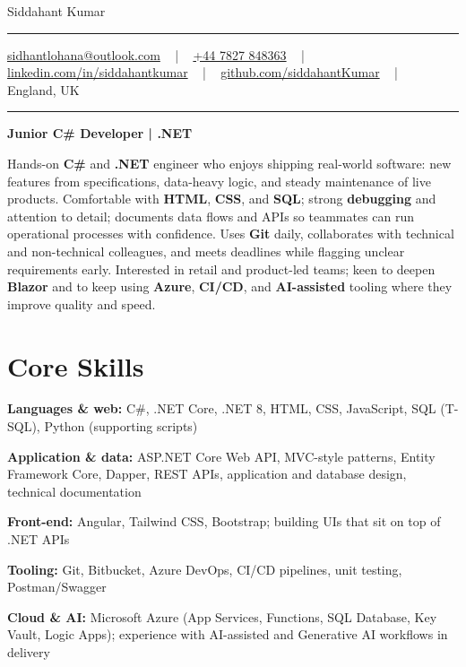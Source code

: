 \documentclass[letterpaper,10pt]{article}
\newcommand{\documentTitle}[2]{
  \begin{center}
    \vspace*{-0.3in}
    {\Huge\color{accentTitle} #1}
    \vspace{8pt}
    {\color{accentLine} \hrule}
    \vspace{2pt}
    \footnotesize{#2}
    \vspace{2pt}
    {\color{accentLine} \hrule}
  \end{center}
}
\newenvironment{resume_list}{
  \vspace{-7pt}
  \begin{itemize}[itemsep=-2px, parsep=1pt, leftmargin=30pt]
}{
  \end{itemize}
}
\begin{document}
\documentTitle{Siddahant Kumar}{
\vspace{0.1cm}
\href{mailto:sidhantlohana@outlook.com}{sidhantlohana@outlook.com} ~ | ~
\href{tel:+447827848363}{+44 7827 848363} ~ | ~
\href{https://www.linkedin.com/in/siddahantkumar/}{linkedin.com/in/siddahantkumar} ~ | ~
\href{https://github.com/siddahantKumar}{github.com/siddahantKumar} ~ | ~
England, UK
}

\begin{center}
\textbf{Junior C\# Developer | .NET}
\end{center}

Hands-on \textbf{C\#} and \textbf{.NET} engineer who enjoys shipping real-world software: new features from specifications, data-heavy logic, and steady maintenance of live products. Comfortable with \textbf{HTML}, \textbf{CSS}, and \textbf{SQL}; strong \textbf{debugging} and attention to detail; documents data flows and APIs so teammates can run operational processes with confidence. Uses \textbf{Git} daily, collaborates with technical and non-technical colleagues, and meets deadlines while flagging unclear requirements early. Interested in retail and product-led teams; keen to deepen \textbf{Blazor} and to keep using \textbf{Azure}, \textbf{CI/CD}, and \textbf{AI-assisted} tooling where they improve quality and speed.


\section{Core Skills}

\begin{resume_list}
    \item \textbf{Languages \& web:} C\#, .NET Core, .NET 8, HTML, CSS, JavaScript, SQL (T-SQL), Python (supporting scripts)
    \item \textbf{Application \& data:} ASP.NET Core Web API, MVC-style patterns, Entity Framework Core, Dapper, REST APIs, application and database design, technical documentation
    \item \textbf{Front-end:} Angular, Tailwind CSS, Bootstrap; building UIs that sit on top of .NET APIs
    \item \textbf{Tooling:} Git, Bitbucket, Azure DevOps, CI/CD pipelines, unit testing, Postman/Swagger
    \item \textbf{Cloud \& AI:} Microsoft Azure (App Services, Functions, SQL Database, Key Vault, Logic Apps); experience with AI-assisted and Generative AI workflows in delivery
\end{resume_list}
\end{document}
